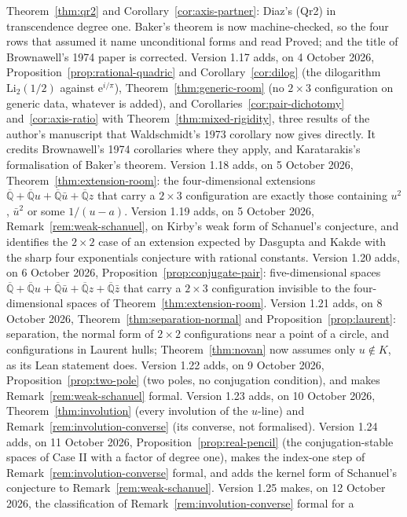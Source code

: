 \documentclass[11pt,a4paper]{article}
\theoremstyle{plain}
\theoremstyle{definition}
\newcommand{\e}{\mathrm{e}}
\newcommand{\Alg}{\overline{\mathbb{Q}}}
\begin{document}
Theorem~\ref{thm:qr2} and Corollary~\ref{cor:axis-partner}: Diaz's (Qr2) in transcendence degree
one. Baker's theorem is now machine-checked, so the four rows that assumed it name unconditional
forms and read Proved; and the title of Brownawell's 1974 paper is corrected.
Version 1.17 adds, on 4 October 2026, Proposition~\ref{prop:rational-quadric} and
Corollary~\ref{cor:dilog} (the dilogarithm $\mathrm{Li}_{2}(1/2)$ against $\e^{i/\pi}$),
Theorem~\ref{thm:generic-room} (no $2\times3$ configuration on generic data, whatever is added), and
Corollaries~\ref{cor:pair-dichotomy} and~\ref{cor:axis-ratio} with Theorem~\ref{thm:mixed-rigidity},
three results of the author's manuscript that Waldschmidt's 1973 corollary now gives directly. It
credits Brownawell's 1974 corollaries where they apply, and Karatarakis's formalisation of Baker's
theorem.
Version 1.18 adds, on 5 October 2026, Theorem~\ref{thm:extension-room}: the four-dimensional
extensions $\Alg+\Alg u+\Alg\bar u+\Alg z$ that carry a $2\times3$ configuration are exactly those
containing $u^{2}$, $\bar u^{2}$ or some $1/(u-a)$.
Version 1.19 adds, on 5 October 2026, Remark~\ref{rem:weak-schanuel}, on Kirby's weak form of Schanuel's
conjecture, and identifies the $2\times2$ case of an extension expected by Dasgupta and Kakde with the
sharp four exponentials conjecture with rational constants.
Version 1.20 adds, on 6 October 2026, Proposition~\ref{prop:conjugate-pair}: five-dimensional spaces
$\Alg+\Alg u+\Alg\bar u+\Alg z+\Alg\bar z$ that carry a $2\times3$ configuration invisible to the
four-dimensional spaces of Theorem~\ref{thm:extension-room}.
Version 1.21 adds, on 8 October 2026, Theorem~\ref{thm:separation-normal} and Proposition~\ref{prop:laurent}: separation,
the normal form of $2\times2$ configurations near a point of a circle, and configurations in Laurent
hulls; Theorem~\ref{thm:novan} now assumes only $u\notin K$, as its Lean statement does.
Version 1.22 adds, on 9 October 2026, Proposition~\ref{prop:two-pole} (two poles, no conjugation condition),
and makes Remark~\ref{rem:weak-schanuel} formal.
Version 1.23 adds, on 10 October 2026, Theorem~\ref{thm:involution} (every involution of the $u$-line) and
Remark~\ref{rem:involution-converse} (its converse, not formalised).
Version 1.24 adds, on 11 October 2026, Proposition~\ref{prop:real-pencil} (the conjugation-stable spaces of
Case II with a factor of degree one), makes the index-one step of Remark~\ref{rem:involution-converse}
formal, and adds the kernel form of Schanuel's conjecture to Remark~\ref{rem:weak-schanuel}.
Version 1.25 makes, on 12 October 2026, the classification of Remark~\ref{rem:involution-converse} formal for a
\end{document}
